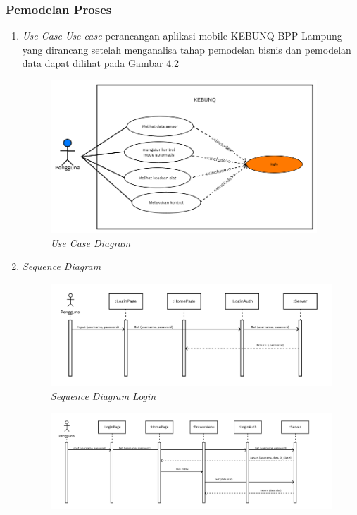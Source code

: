 \begin{flushleft}
\begin{justify}
        \subsubsection{Pemodelan Proses}
        \begin{enumerate}[label=\alph*.]
            \item \textit{Use Case}
            \textit{Use case} perancangan aplikasi mobile KEBUNQ BPP Lampung yang dirancang setelah menganalisa tahap pemodelan bisnis dan 
            pemodelan data dapat dilihat pada Gambar 4.2
            \begin{figure}[ht]
                \centering
                \includegraphics[width=10cm]{images/bab 4/use-case-user.png}
                \caption{\textit{Use Case Diagram}}
            \end{figure}
            \item \textit{Sequence Diagram}
            \begin{figure}[ht]
                \centering
                \includegraphics[width=12cm]{images/bab 4/Sequence login.png}
                \caption{\textit{Sequence Diagram Login}}
            \end{figure}
            \begin{figure}[ht]
                \centering
                \includegraphics[width=12cm]{images/bab 4/buka menu alat.png}

\end{figure}
\end{enumerate}
\end{justify}
\end{flushleft}
